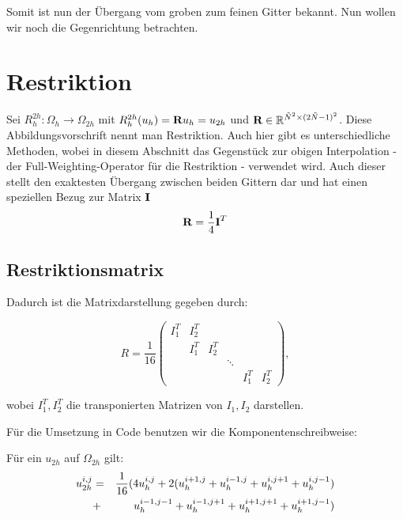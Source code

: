 Somit ist nun der Übergang vom groben zum feinen Gitter bekannt. Nun wollen wir noch die Gegenrichtung betrachten.

\section{Restriktion}

Sei $R_{h}^{2h}: \Omega_{h} \longrightarrow \Omega_{2h}$ mit $R_{h}^{2h}(u_{h}) = {\textbf{R}}u_{h} = u_{2h}$ und ${\textbf{R}} \in \mathbb{R}^{\tilde N^{2} \times (2 \tilde N - 1)^{2}}$. Diese Abbildungsvorschrift nennt man Restriktion. Auch hier gibt es unterschiedliche Methoden, wobei in diesem Abschnitt das Gegenstück zur obigen Interpolation - der Full-Weighting-Operator für die Restriktion - verwendet wird. Auch dieser stellt den exaktesten Übergang zwischen beiden Gittern dar und hat einen speziellen Bezug zur Matrix ${\textbf{I}}$
\begin{equation}
{\textbf{R}} = \frac {1} {4} {\textbf{I}}^{T}
\end{equation}

\subsection{Restriktionsmatrix}

Dadurch ist die Matrixdarstellung gegeben durch:

\begin{equation}
R = \frac{1}{16}
\begin{pmatrix}
I_{1}^{T} & I_{2}^{T}\\
		  & I_{1}^{T} & I_{2}^{T}\\
		  &			  &			  & \ddots\\
		  &			  &			  &		   & I_{1}^{T} & I_{2}^{T}
\end{pmatrix},
\end{equation}

wobei $I_{1}^{T}, I_{2}^{T}$ die transponierten Matrizen von $I_{1}, I_{2}$ darstellen.

Für die Umsetzung in Code benutzen wir die Komponentenschreibweise:

Für ein $u_{2h}$ auf $\Omega_{2h}$ gilt:
\begin{eqnarray}
u_{2h}^{i,j} &=& \frac {1} {16} (4u_{h}^{i,j}+2(u_{h}^{i+1,j}+u_{h}^{i-1,j}+u_{h}^{i,j+1}+u_{h}^{i,j-1})\notag \\
&+& u_{h}^{i-1,j-1}+u_{h}^{i-1,j+1}+u_{h}^{i+1,j+1}+u_{h}^{i+1,j-1})
\end{eqnarray}

